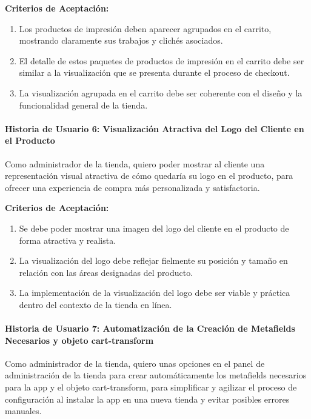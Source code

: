 \documentclass[12pt]{article}
\newcommand{\subsubsubsection}[1]{\paragraph{#1}}
\begin{document}
\vspace{0.5cm}
\textbf{Criterios de Aceptación:}
\begin{enumerate}[label=\arabic*.]
    \item Los productos de impresión deben aparecer agrupados en el carrito, mostrando claramente sus trabajos y clichés asociados.
    \item El detalle de estos paquetes de productos de impresión en el carrito debe ser similar a la visualización que se presenta durante el proceso de checkout.
    \item La visualización agrupada en el carrito debe ser coherente con el diseño y la funcionalidad general de la tienda.
\end{enumerate}


\subsubsubsection{Historia de Usuario 6: Visualización Atractiva del Logo del Cliente en el Producto}\label{sec:historia6}

Como administrador de la tienda,
quiero poder mostrar al cliente una representación visual atractiva de cómo quedaría su logo en el producto,
para ofrecer una experiencia de compra más personalizada y satisfactoria.

\vspace{0.5cm}
\textbf{Criterios de Aceptación:}
\begin{enumerate}[label=\arabic*.]
    \item Se debe poder mostrar una imagen del logo del cliente en el producto de forma atractiva y realista.
    \item La visualización del logo debe reflejar fielmente su posición y tamaño en relación con las áreas designadas del producto.
    \item La implementación de la visualización del logo debe ser viable y práctica dentro del contexto de la tienda en línea.
\end{enumerate}


\subsubsubsection{Historia de Usuario 7: Automatización de la Creación de Metafields Necesarios y objeto cart-transform}\label{sec:historia7}

Como administrador de la tienda,
quiero unas opciones en el panel de administración de la tienda para crear automáticamente los metafields necesarios para la app y el objeto cart-transform,
para simplificar y agilizar el proceso de configuración al instalar la app en una nueva tienda y evitar posibles errores manuales.
\end{document}
